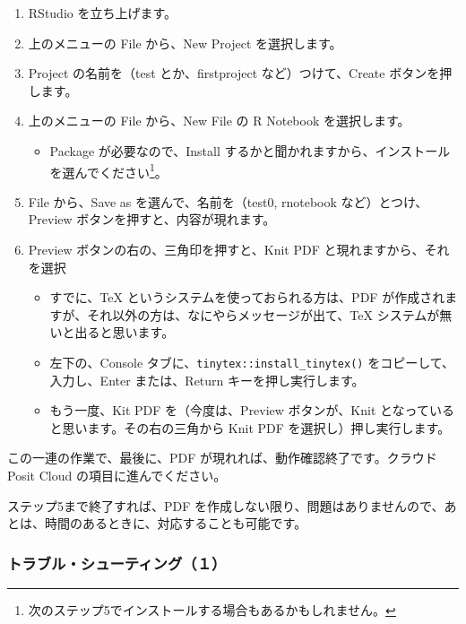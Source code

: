 \documentclass[
]{bxjsbook}
\providecommand{\tightlist}{%
  \setlength{\itemsep}{0pt}\setlength{\parskip}{0pt}}
\theoremstyle{definition}
\theoremstyle{definition}
\theoremstyle{definition}
\theoremstyle{definition}
\theoremstyle{remark}
\begin{document}
\begin{enumerate}
\def\labelenumi{\arabic{enumi}.}
\tightlist
\item
  RStudio を立ち上げます。
\item
  上のメニューの File から、New Project を選択します。
\item
  Project の名前を（test とか、firstproject など）つけて、Create ボタンを押します。
\item
  上のメニューの File から、New File の R Notebook を選択します。

  \begin{itemize}
  \tightlist
  \item
    Package が必要なので、Install するかと聞かれますから、インストールを選んでください\footnote{次のステップ5でインストールする場合もあるかもしれません。}。
  \end{itemize}
\item
  File から、Save as を選んで、名前を（test0, rnotebook など）とつけ、Preview ボタンを押すと、内容が現れます。
\item
  Preview ボタンの右の、三角印を押すと、Knit PDF と現れますから、それを選択

  \begin{itemize}
  \tightlist
  \item
    すでに、TeX というシステムを使っておられる方は、PDF が作成されますが、それ以外の方は、なにやらメッセージが出て、TeX システムが無いと出ると思います。
  \item
    左下の、Console タブに、\texttt{tinytex::install\_tinytex()} をコピーして、入力し、Enter または、Return キーを押し実行します。
  \item
    もう一度、Kit PDF を（今度は、Preview ボタンが、Knit となっていると思います。その右の三角から Knit PDF を選択し）押し実行します。
  \end{itemize}
\end{enumerate}

この一連の作業で、最後に、PDF が現れれば、動作確認終了です。クラウド Posit Cloud の項目に進んでください。

ステップ5まで終了すれば、PDF を作成しない限り、問題はありませんので、あとは、時間のあるときに、対応することも可能です。

\hypertarget{ux30c8ux30e9ux30d6ux30ebux30b7ux30e5ux30fcux30c6ux30a3ux30f3ux30b0uxff11}{%
\subsubsection{トラブル・シューティング（１）}\label{ux30c8ux30e9ux30d6ux30ebux30b7ux30e5ux30fcux30c6ux30a3ux30f3ux30b0uxff11}}
\end{document}
